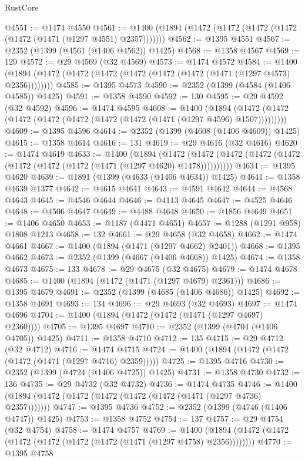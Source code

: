 \begin{lexlean}{RustCore}
\begin{coremodule}
{\begin{coremodule}
{{{{{{{{{{{{{{{{{{{{{{{{{{{{{{{{{{{{{{{{{{{{@4551 := @1474 @4550
@4561 := @1400 (@1894 (@1472 (@1472 (@1472 (@1472 (@1472 (@1471 (@1297 @4551) @2357)))))))
@4562 := @1395 @4551
@4567 := @2352 (@1399 (@4561 (@1406 @4562)) @1425)
@4568 := @1358 @4567
@4569 := 129
@4572 := @29 @4569 (@32 @4569)
@4573 := @1474 @4572
@4584 := @1400 (@1894 (@1472 (@1472 (@1472 (@1472 (@1472 (@1472 (@1471 (@1297 @4573) @2356))))))))
@4585 := @1395 @4573
@4590 := @2352 (@1399 (@4584 (@1406 @4585)) @1425)
@4591 := @1358 @4590
@4592 := 130
@4595 := @29 @4592 (@32 @4592)
@4596 := @1474 @4595
@4608 := @1400
    (@1894 (@1472 (@1472 (@1472 (@1472 (@1472 (@1472 (@1472 (@1471 (@1297 @4596) @1507)))))))))
@4609 := @1395 @4596
@4614 := @2352 (@1399 (@4608 (@1406 @4609)) @1425)
@4615 := @1358 @4614
@4616 := 131
@4619 := @29 @4616 (@32 @4616)
@4620 := @1474 @4619
@4633 := @1400
    (@1894
      (@1472 (@1472 (@1472 (@1472 (@1472 (@1472 (@1472 (@1472 (@1471 (@1297 @4620) @1478))))))))))
@4634 := @1395 @4620
@4639 := @1891 (@1399 (@4633 (@1406 @4634)) @1425)
@4641 := @1358 @4639 @1377
@4642 := @4615 @4641
@4643 := @4591 @4642
@4644 := @4568 @4643
@4645 := @4546 @4644
@4646 := @4113 @4645
@4647 := @4525 @4646
@4648 := @4506 @4647
@4649 := @4488 @4648
@4650 := @1856 @4649
@4651 := @1406 @4650
@4653 := @1187 (@4471 @4651)
@4657 := @1288 (@1291 @958) @1808 @1213
@4658 := 132
@4661 := @29 @4658 (@32 @4658)
@4662 := @1474 @4661
@4667 := @1400 (@1894 (@1471 (@1297 @4662) @2401))
@4668 := @1395 @4662
@4673 := @2352 (@1399 (@4667 (@1406 @4668)) @1425)
@4674 := @1358 @4673
@4675 := 133
@4678 := @29 @4675 (@32 @4675)
@4679 := @1474 @4678
@4685 := @1400 (@1894 (@1472 (@1471 (@1297 @4679) @2361)))
@4686 := @1395 @4679
@4691 := @2352 (@1399 (@4685 (@1406 @4686)) @1425)
@4692 := @1358 @4691
@4693 := 134
@4696 := @29 @4693 (@32 @4693)
@4697 := @1474 @4696
@4704 := @1400 (@1894 (@1472 (@1472 (@1471 (@1297 @4697) @2360))))
@4705 := @1395 @4697
@4710 := @2352 (@1399 (@4704 (@1406 @4705)) @1425)
@4711 := @1358 @4710
@4712 := 135
@4715 := @29 @4712 (@32 @4712)
@4716 := @1474 @4715
@4724 := @1400 (@1894 (@1472 (@1472 (@1472 (@1471 (@1297 @4716) @2359)))))
@4725 := @1395 @4716
@4730 := @2352 (@1399 (@4724 (@1406 @4725)) @1425)
@4731 := @1358 @4730
@4732 := 136
@4735 := @29 @4732 (@32 @4732)
@4736 := @1474 @4735
@4746 := @1400 (@1894 (@1472 (@1472 (@1472 (@1472 (@1472 (@1471 (@1297 @4736) @2357)))))))
@4747 := @1395 @4736
@4752 := @2352 (@1399 (@4746 (@1406 @4747)) @1425)
@4753 := @1358 @4752
@4754 := 137
@4757 := @29 @4754 (@32 @4754)
@4758 := @1474 @4757
@4769 := @1400 (@1894 (@1472 (@1472 (@1472 (@1472 (@1472 (@1472 (@1471 (@1297 @4758) @2356))))))))
@4770 := @1395 @4758
}}}}}}}}}}}}}}}}}}}}}}}}}}}}}}}}}}}}}}}}}}}}
\end{coremodule}}
\end{coremodule}
\end{lexlean}
